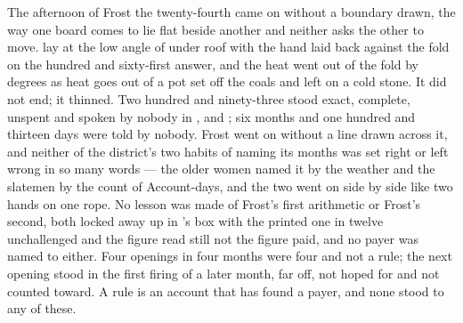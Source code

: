 The afternoon of Frost the twenty-fourth came on without a boundary drawn, the way one board comes to lie flat beside another and neither asks the other to move.  lay at the low angle of  under  roof with the hand laid back against the fold on the hundred and sixty-first answer, and the heat went out of the fold by degrees as heat goes out of a pot set off the coals and left on a cold stone. It did not end; it thinned. Two hundred and ninety-three stood exact, complete, unspent and spoken by nobody in ,  and ; six months and one hundred and thirteen days were told by nobody. Frost went on without a line drawn across it, and neither of the district's two habits of naming its months was set right or left wrong in so many words --- the older women named it by the weather and the slatemen by the count of Account-days, and the two went on side by side like two hands on one rope. No lesson was made of Frost's first arithmetic or Frost's second, both locked away up  in 's box with the printed one in twelve unchallenged and the figure read still not the figure paid, and no payer was named to either. Four openings in four months were four and not a rule; the next opening stood in the first firing of a later month, far off, not hoped for and not counted toward. A rule is an account that has found a payer, and none stood to any of these.

